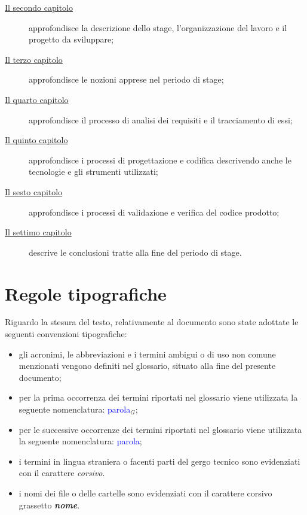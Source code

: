 \begin{description}
    \item[{\hyperref[cap:descrizione-stage]{Il secondo capitolo}}] approfondisce la descrizione dello stage, l'organizzazione del lavoro e il progetto da sviluppare;
    
    \item[{\hyperref[cap:nozioni-apprese]{Il terzo capitolo}}] approfondisce le nozioni apprese nel periodo di stage;
    
    \item[{\hyperref[cap:analisi-requisiti]{Il quarto capitolo}}] approfondisce il processo di analisi dei requisiti e il tracciamento di essi;
    
    \item[{\hyperref[cap:progettazione-codifica]{Il quinto capitolo}}] approfondisce i processi di progettazione e codifica descrivendo anche le tecnologie e gli strumenti utilizzati;
    
    \item[{\hyperref[cap:verifica-validazione]{Il sesto capitolo}}] approfondisce i processi di validazione e verifica del codice prodotto;
    
    \item[{\hyperref[cap:conclusioni]{Il settimo capitolo}}] descrive le conclusioni tratte alla fine del periodo di stage.
\end{description}

\section{Regole tipografiche}
\label{sec:regole-tipografiche}

Riguardo la stesura del testo, relativamente al documento sono state adottate le seguenti convenzioni tipografiche:
\begin{itemize}
	\item gli acronimi, le abbreviazioni e i termini ambigui o di uso non comune menzionati vengono definiti nel glossario, situato alla fine del presente documento;
	\item per la prima occorrenza dei termini riportati nel glossario viene utilizzata la seguente nomenclatura: \textcolor{blue}{parola}$_G$;
	\item per le successive occorrenze dei termini riportati nel glossario viene utilizzata la seguente nomenclatura: \textcolor{blue}{parola};
	\item i termini in lingua straniera o facenti parti del gergo tecnico sono evidenziati con il carattere \emph{corsivo}.
	\item i nomi dei file o delle cartelle sono evidenziati con il carattere corsivo grassetto \textbf{\textit{nome}}.
\end{itemize}